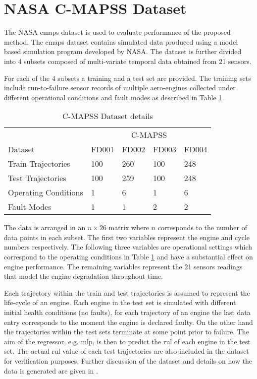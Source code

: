 \section{NASA C-MAPSS Dataset}
\label{sec:rul_dataset}

The NASA \gls{cmaps} dataset is used to evaluate performance of the proposed method. The \gls{cmaps} dataset contains simulated data produced using a model based simulation program developed by NASA. The dataset is further divided into 4 subsets composed of multi-variate temporal data obtained from 21 sensors.

For each of the 4 subsets a training and a test set are provided. The training sets include run-to-failure sensor records of multiple aero-engines collected under different operational conditions and fault modes as described in Table \ref{table:cmapss}.

\begin{table}[!htb]
\centering
\begin{tabular}{l | l l l l}
	\hline
	 & \multicolumn{4}{c}{C-MAPSS}\\  
	 Dataset & FD001 & FD002 & FD003 & FD004\\
  	\hline
  	Train Trajectories & 100 & 260 & 100 & 248\\
  	Test Trajectories & 100 & 259 & 100 & 248\\
  	Operating Conditions & 1 & 6 & 1 & 6\\
  	Fault Modes & 1 & 1 & 2 & 2\\
  	\hline
\end{tabular}
\caption{C-MAPSS Dataset details}
\label{table:cmapss}
\end{table}

The data is arranged in an $n\times26$ matrix where $n$ corresponds to the number of data points in each subset. The first two variables represent the engine and cycle numbers respectively. The following three variables are operational settings which correspond to the operating conditions in Table \ref{table:cmapss} and have a substantial effect on engine performance. The remaining variables represent the 21 sensors readings that model the engine degradation throughout time.

Each trajectory within the train and test trajectories is assumed to represent the life-cycle of an engine. Each engine in the test set is simulated with different initial health conditions (no faults), for each trajectory of an engine the last data entry corresponds to the moment the engine is declared faulty. On the other hand the trajectories within the test sets terminate at some point prior to failure. The aim of the regressor, e.g. \gls{mlp}, is then to predict the \gls{rul} of each engine in the test set. The actual \gls{rul} value of each test trajectories are also included in the dataset for verification purposes. Further discussion of the dataset and details on how the data is generated are given in \citep{Saxena2008}.

